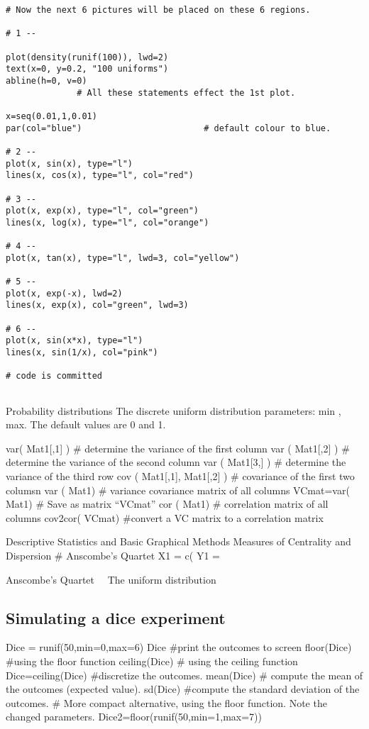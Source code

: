 \begin{verbatim}
# Now the next 6 pictures will be placed on these 6 regions. 

# 1 --

plot(density(runif(100)), lwd=2)
text(x=0, y=0.2, "100 uniforms")        
abline(h=0, v=0)
	          # All these statements effect the 1st plot.

x=seq(0.01,1,0.01)
par(col="blue")                        # default colour to blue.

# 2 --
plot(x, sin(x), type="l")
lines(x, cos(x), type="l", col="red")

# 3 --
plot(x, exp(x), type="l", col="green")
lines(x, log(x), type="l", col="orange")

# 4 --
plot(x, tan(x), type="l", lwd=3, col="yellow")

# 5 --
plot(x, exp(-x), lwd=2)
lines(x, exp(x), col="green", lwd=3)

# 6 --
plot(x, sin(x*x), type="l")
lines(x, sin(1/x), col="pink")

# code is committed
 
\end{verbatim}

 
Probability distributions
The discrete uniform distribution
parameters: min , max.
The default values are 0 and 1.
 



var( Mat1[,1] )			# determine the variance of the first column 
var ( Mat1[,2] )			# determine the variance of the second column
var ( Mat1[3,] )			# determine the variance of the third row
cov ( Mat1[,1], Mat1[,2] )	# covariance of the first two columsn
var ( Mat1)			# variance covariance matrix of all columns
VCmat=var( Mat1)		# Save as matrix “VCmat”
cor ( Mat1)			# correlation matrix of all columns
cov2cor( VCmat)		#convert a VC matrix to a correlation matrix

 
Descriptive Statistics and Basic Graphical Methods
Measures of Centrality and Dispersion
# Anscombe’s  Quartet
X1 = c(
Y1 =
 

Anscombe’s Quartet 
The uniform distribution

\subsection{Simulating a dice experiment}
Dice = runif(50,min=0,max=6)	
Dice				#print the outcomes to screen
floor(Dice)			#using the floor function
ceiling(Dice)			# using the ceiling function
Dice=ceiling(Dice)		#discretize the outcomes.
mean(Dice)			# compute the mean of the outcomes (expected value).
sd(Dice)			#compute the standard deviation of the outcomes.
# More compact alternative, using the floor function. Note the changed parameters.
Dice2=floor(runif(50,min=1,max=7))	

